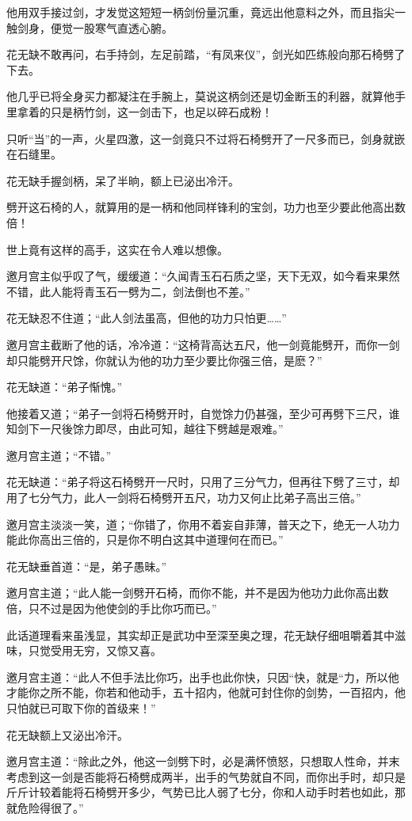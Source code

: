 \documentclass[12pt,oneside]{book}
\begin{document}
他用双手接过剑，才发觉这短短一柄剑份量沉重，竟远出他意料之外，而且指尖一触剑身，便觉一股寒气直透心腑。

花无缺不敢再问，右手持剑，左足前踏，``有凤来仪''，剑光如匹练般向那石椅劈了下去。

他几乎已将全身买力都凝注在手腕上，莫说这柄剑还是切金断玉的利器，就算他手里拿着的只是柄竹剑，这一剑击下，也足以碎石成粉！

只听``当''的一声，火星四激，这一剑竟只不过将石椅劈开了一尺多而已，剑身就嵌在石缝里。

花无缺手握剑柄，呆了半晌，额上已泌出冷汗。

劈开这石椅的人，就算用的是一柄和他同样锋利的宝剑，功力也至少要此他高出数倍！

世上竟有这样的高手，这实在令人难以想像。

邀月宫主似乎叹了气，缓缓道：``久闻青玉石石质之坚，天下无双，如今看来果然不错，此人能将青玉石一劈为二，剑法倒也不差。''

花无缺忍不住道；``此人剑法虽高，但他的功力只怕更\ldots\ldots{}''

邀月宫主截断了他的话，冷冷道：``这椅背高达五尺，他一剑竟能劈开，而你一剑却只能劈开尺馀，你就认为他的功力至少要比你强三倍，是麽？''

花无缺道：``弟子惭愧。''

他接着又道；``弟子一剑将石椅劈开时，自觉馀力仍甚强，至少可再劈下三尺，谁知剑下一尺後馀力即尽，由此可知，越往下劈越是艰难。''

邀月宫主道；``不错。''

花无缺道：``弟子将这石椅劈开一尺时，只用了三分气力，但再往下劈了三寸，却用了七分气力，此人一剑将石椅劈开五尺，功力又何止比弟子高出三倍。''

邀月宫主淡淡一笑，道；``你错了，你用不着妄自菲薄，普天之下，绝无一人功力能此你高出三倍的，只是你不明白这其中道理何在而已。''

花无缺垂首道：``是，弟子愚昧。''

邀月宫主道；``此人能一剑劈开石椅，而你不能，并不是因为他功力此你高出数倍，只不过是因为他使剑的手比你巧而已。''

此话道理看来虽浅显，其实却正是武功中至深至奥之理，花无缺仔细咀嚼着其中滋味，只觉受用无穷，又惊又喜。

邀月宫主道：``此人不但手法比你巧，出手也此你快，只因``快，就是``力，所以他才能你之所不能，你若和他动手，五十招内，他就可封住你的剑势，一百招内，他只怕就已可取下你的首级来！''

花无缺额上又泌出冷汗。

邀月宫主道：``除此之外，他这一剑劈下时，必是满怀愤怒，只想取人性命，并末考虑到这一剑是否能将石椅劈成两半，出手的气势就自不同，而你出手时，却只是斤斤计较着能将石椅劈开多少，气势已比人弱了七分，你和人动手时若也如此，那就危险得很了。''
\end{document}

